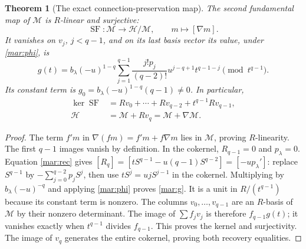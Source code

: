 \documentclass[11pt]{article}
\newtheorem{theorem}{Theorem}
\newcommand{\SF}{\operatorname{SF}}
\begin{document}
\begin{theorem}[The exact connection-preservation map]\label{mar:SFthm}
The second fundamental map of $\mathscr M$ is $R$-linear and surjective:
\begin{equation}\tag{MAR12}\label{mar:SF}
 \SF:\mathscr M\longrightarrow\mathscr H/\mathscr M,
 \qquad m\longmapsto[\nabla m].
\end{equation}
It vanishes on $v_j$, $j<q-1$, and on its last basis vector its value,
under \eqref{mar:phi}, is
\begin{equation}\tag{MAR13}\label{mar:g}
 g(t)=b_\lambda(-u)^{1-q}
 \sum_{j=1}^{q-1}\frac{j!p_j}{(q-2)!}
                 u^{j-q+1}t^{q-1-j}\pmod{t^{q-1}}.
\end{equation}
Its constant term is $g_0=b_\lambda(-u)^{1-q}(q-1)\ne0$.
In particular,
\begin{equation}\tag{MAR14}\label{mar:SFkernel}
 \begin{aligned}
 \ker\SF&=Rv_0+\cdots+Rv_{q-2}+t^{q-1}Rv_{q-1},\\
 \mathscr H&=\mathscr M+Rv_q=\mathscr M+\nabla\mathscr M.
 \end{aligned}
\end{equation}
\end{theorem}
\begin{proof}
The term $f'm$ in $\nabla(fm)=f'm+f\nabla m$ lies in
$\mathscr M$, proving $R$-linearity. The first $q-1$ images
vanish by definition. In the cokernel, $R_{q-1}=0$ and
$p_\lambda=0$. Equation \eqref{mar:rec} gives
$[R_q]=[tS^{q-1}-u(q-1)S^{q-2}]=[-u p_\lambda']$:
replace $S^{q-1}$ by $-\sum_{j=0}^{q-2}p_jS^j$, then use
$tS^j=ujS^{j-1}$ in the cokernel. Multiplying by
$b_\lambda(-u)^{-q}$ and applying \eqref{mar:phi} proves
\eqref{mar:g}. It is a unit in $R/(t^{q-1})$ because its
constant term is nonzero. The columns $v_0,\ldots,v_{q-1}$
are an $R$-basis of $\mathscr M$ by their nonzero determinant.
The image of $\sum f_jv_j$ is therefore $f_{q-1}g(t)$;
it vanishes exactly when $t^{q-1}$ divides $f_{q-1}$. This
proves the kernel and surjectivity. The image of $v_q$ generates
the entire cokernel, proving both recovery equalities.
\end{proof}
\end{document}
